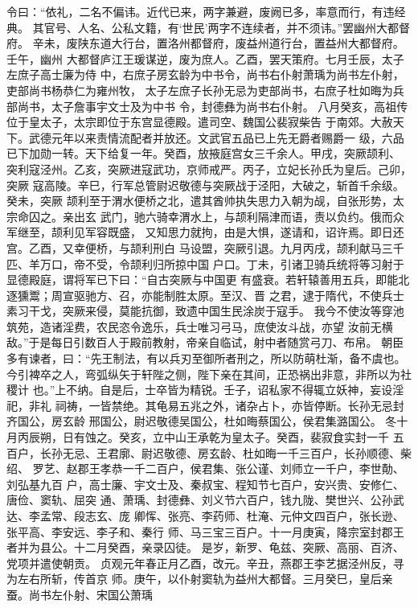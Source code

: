 \documentclass[12pt,UTF8]{ctexbook}
\begin{document}
令曰：“依礼，二名不偏讳。近代已来，两字兼避，废阙已多，率意而行，有违经典。
其官号、人名、公私文籍，有‘世民’两字不连续者，并不须讳。”罢幽州大都督府。
辛未，废陕东道大行台，置洛州都督府，废益州道行台，置益州大都督府。壬午，幽州
大都督庐江王瑗谋逆，废为庶人。乙酉，罢天策府。七月壬辰，太子左庶子高士廉为侍
中，右庶子房玄龄为中书令，尚书右仆射萧瑀为尚书左仆射，吏部尚书杨恭仁为雍州牧，
太子左庶子长孙无忌为吏部尚书，右庶子杜如晦为兵部尚书，太子詹事宇文士及为中书
令，封德彝为尚书右仆射。
八月癸亥，高祖传位于皇太子，太宗即位于东宫显德殿。遣司空、魏国公裴寂柴告
于南郊。大赦天下。武德元年以来责情流配者并放还。文武官五品已上先无爵者赐爵一
级，六品已下加勋一转。天下给复一年。癸酉，放掖庭宫女三千余人。甲戌，突厥颉利、
突利寇泾州。乙亥，突厥进寇武功，京师戒严。丙子，立妃长孙氏为皇后。己卯，突厥
寇高陵。辛巳，行军总管尉迟敬德与突厥战于泾阳，大破之，斩首千余级。癸未，突厥
颉利至于渭水便桥之北，遣其酋帅执失思力入朝为觇，自张形势，太宗命囚之。亲出玄
武门，驰六骑幸渭水上，与颉利隔津而语，责以负约。俄而众军继至，颉利见军容既盛，
又知思力就拘，由是大惧，遂请和，诏许焉。即日还宫。乙酉，又幸便桥，与颉利刑白
马设盟，突厥引退。九月丙戌，颉利献马三千匹、羊万口，帝不受，令颉利归所掠中国
户口。丁未，引诸卫骑兵统将等习射于显德殿庭，谓将军已下曰：“自古突厥与中国更
有盛衰。若轩辕善用五兵，即能北逐獯鬻；周宣驱驰方、召，亦能制胜太原。至汉、晋
之君，逮于隋代，不使兵士素习干戈，突厥来侵，莫能抗御，致遗中国生民涂炭于寇手。
我今不使汝等穿池筑苑，造诸淫费，农民恣令逸乐，兵士唯习弓马，庶使汝斗战，亦望
汝前无横敌。”于是每日引数百人于殿前教射，帝亲自临试，射中者随赏弓刀、布帛。
朝臣多有谏者，曰：“先王制法，有以兵刃至御所者刑之，所以防萌杜渐，备不虞也。
今引裨卒之人，弯弧纵矢于轩陛之侧，陛下亲在其间，正恐祸出非意，非所以为社稷计
也。”上不纳。自是后，士卒皆为精锐。壬子，诏私家不得辄立妖神，妄设淫祀，非礼
祠祷，一皆禁绝。其龟易五兆之外，诸杂占卜，亦皆停断。长孙无忌封齐国公，房玄龄
邢国公，尉迟敬德吴国公，杜如晦蔡国公，侯君集潞国公。
冬十月丙辰朔，日有蚀之。癸亥，立中山王承乾为皇太子。癸酉，裴寂食实封一千
五百户，长孙无忌、王君廓、尉迟敬德、房玄龄、杜如晦一千三百户，长孙顺德、柴绍、
罗艺、赵郡王孝恭一千二百户，侯君集、张公谨、刘师立一千户，李世勣、刘弘基九百
户，高士廉、宇文士及、秦叔宝、程知节七百户，安兴贵、安修仁、唐俭、窦轨、屈突
通、萧瑀、封德彝、刘义节六百户，钱九陇、樊世兴、公孙武达、李孟常、段志玄、庞
卿恽、张亮、李药师、杜淹、元仲文四百户，张长逊、张平高、李安远、李子和、秦行
师、马三宝三百户。十一月庚寅，降宗室封郡王者并为县公。十二月癸酉，亲录囚徒。
是岁，新罗、龟兹、突厥、高丽、百济、党项并遣使朝贡。
贞观元年春正月乙酉，改元。辛丑，燕郡王李艺据泾州反，寻为左右所斩，传首京
师。庚午，以仆射窦轨为益州大都督。三月癸巳，皇后亲蚕。尚书左仆射、宋国公萧瑀
\end{document}
